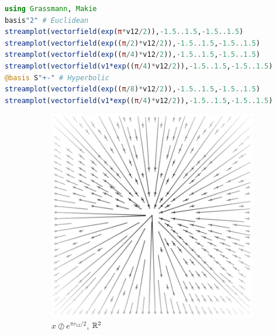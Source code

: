 \documentclass{juliacon}
\begin{document}
\begin{lstlisting}[language = Julia]
using Grassmann, Makie
basis"2" # Euclidean
streamplot(vectorfield(exp(π*v12/2)),-1.5..1.5,-1.5..1.5)
streamplot(vectorfield(exp((π/2)*v12/2)),-1.5..1.5,-1.5..1.5)
streamplot(vectorfield(exp((π/4)*v12/2)),-1.5..1.5,-1.5..1.5)
streamplot(vectorfield(v1*exp((π/4)*v12/2)),-1.5..1.5,-1.5..1.5)
@basis S"+-" # Hyperbolic
streamplot(vectorfield(exp((π/8)*v12/2)),-1.5..1.5,-1.5..1.5)
streamplot(vectorfield(v1*exp((π/4)*v12/2)),-1.5..1.5,-1.5..1.5)
\end{lstlisting}
\begin{figure}[ht]
	\centering
	\begin{subfigure}[b]{0.23\textwidth}
		\includegraphics[width=\textwidth]{img/plane-1.png}
		\caption{$x\oslash e^{\pi v_{12}/2}$, $\mathbb{R}^2$}
	\end{subfigure}
	~
	\begin{subfigure}[b]{0.23\textwidth}

\end{subfigure}
\end{figure}
\end{document}
